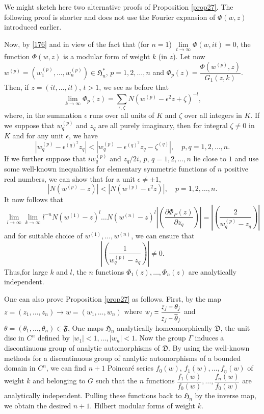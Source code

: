 We might sketch here two alternative proofs of Proposition
\ref{prop27}. The following proof is shorter and does not use the
Fourier expansion of $\Phi(w,z)$ introduced earlier.

Now, by \eqref{176} and in view of the fact that (for $n=1$)
$\lim\limits_{t\to \infty}\Phi(w,it)=0$, the function $\Phi(w,z)$ is a
modular form of weight $k$ (in $z$). Let now
$w^{(p)}=(w^{(p)}_{1},\ldots,w^{(p)}_{n})\in\mathfrak{H}^{\ast}_{n}$,
$p=1,2,\ldots,n$ and
$\Phi_{p}(z)=\dfrac{\Phi(w^{(p)},z)}{G_{1}(z,k)}$. Then, if
$z=(it,\ldots,it)$, $t>1$, we see as before that
$$
\lim\limits_{k\to
  \infty}\Phi_{p}(z)=\sum_{\epsilon,\zeta}N(w^{(p)}-\epsilon^{2}z+\zeta)^{-l},
$$
where, in the summation $\epsilon$ runs over all units of $K$ and
$\zeta$ over all integers in $K$. If we suppose that $w^{(p)}_{q}$ and
$z_{q}$ are all purely imaginary, then for integral $\zeta\neq 0$ in
$K$ and for any unit $\epsilon$, we have
$$
\left|w^{(p)}_{q}-\epsilon^{(q)^{2}}z_{q}\right|<\left|w^{(p)}_{q}-\epsilon^{(q)^{2}}z_{q}-\zeta^{(q)}\right|,\quad
p, q=1,2,\ldots,n.
$$
If we further suppose that $iw^{(p)}_{q}$ and $z_{q}/2i$, $p$,
$q=1,2,\ldots,n$ lie close to $1$ and use some well-known inequalities
for elementary symmetric functions of $n$ positive real numbers, we
can show that for a unit $\epsilon\neq \pm 1$,
$$
|N(w^{(p)}-z)|<|N(w^{(p)}-\epsilon^{2}z)|,\quad p=1,2,\ldots,n.
$$
It now follows that
$$
\lim\limits_{l\to \infty}\lim\limits_{k\to
  \infty}l^{-n}N(w^{(1)}-z)^{l}\ldots
N(w^{(n)}-z)^{l}\left|\left(\frac{\partial \Phi_{P}(z)}{\partial
  z_{q}}\right)\right|=\left|\left(\frac{2}{w^{(p)}_{q}-z_{q}}\right)\right| 
$$
and for suitable choice of $w^{(1)},\ldots,w^{(n)}$, we can ensure
that
$$
\left|\left(\frac{1}{w^{(p)}_{q}-z_{q}}\right)\right|\neq 0.
$$
Thus,\pageoriginale for large $k$ and $l$, the $n$ functions
$\Phi_{1}(z),\ldots,\Phi_{n}(z)$ are analytically independent.

One can also prove Proposition \ref{prop27} as follows. First, by the
map $z=(z_{1},\ldots,z_{n})\to w=(w_{1},\ldots,w_{n})$ where
$w_{j}=\dfrac{z_{j}-\theta_{j}}{z_{j}-\overline{\theta}_{j}}$ and
$\theta=(\theta_{1},\ldots,\theta_{n})\in\mathfrak{F}$, One maps
$\mathfrak{H}_{n}$ analytically homeomorphically $\mathfrak{D}$, the
unit disc in $C^{n}$ defined by $|w_{1}|<1,\ldots,|w_{n}|<1$. Now the
group $\Gamma$ induces a discontinuous group of analytic automorphisms
of $\mathfrak{D}$. By using the well-known methods for a discontinuous
group of analytic automorphisms of a bounded domain in $C^{n}$, we can
find $n+1$ Poincar\'e series $f_{0}(w)$, $f_{1}(w),\ldots,f_{n}(w)$ of
weight $k$ and belonging to $G$ such that the $n$ functions
$\dfrac{f_{1}(w)}{f_{0}(w)},\ldots,\dfrac{f_{n}(w)}{f_{0}(w)}$ are
analytically independent. Pulling these functions back to
$\mathfrak{H}_{n}$ by the inverse map, we obtain the desired
$n+1$. Hilbert modular forms of weight $k$.

